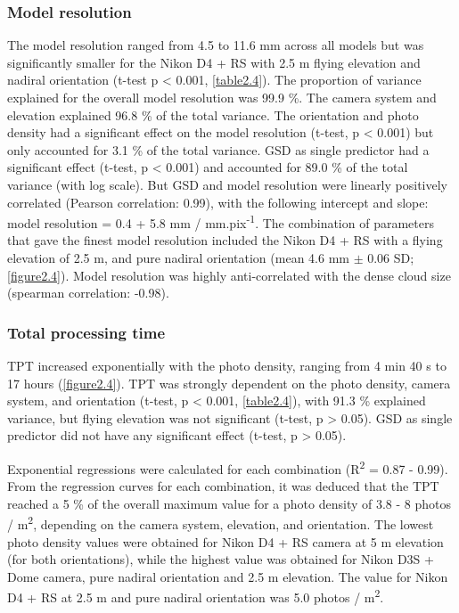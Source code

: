 \subsubsection{Model resolution}\label{chapitre2_3.1.3}
The model resolution ranged from 4.5 to 11.6 mm across all models but was significantly smaller for the Nikon D4 + RS with 2.5 m flying elevation and nadiral orientation (t-test p < 0.001, \autoref{table2.4}). The proportion of variance explained for the overall model resolution was 99.9 \%. The camera system and elevation explained 96.8 \% of the total variance. The orientation and photo density had a significant effect on the model resolution (t-test, p < 0.001) but only accounted for 3.1 \% of the total variance. GSD as single predictor had a significant effect (t-test, p < 0.001) and accounted for 89.0 \% of the total variance (with log scale). But GSD and model resolution were linearly positively correlated (Pearson correlation: 0.99), with the following intercept and slope: model resolution = 0.4 + 5.8 mm / mm.pix\textsuperscript{-1}. The combination of parameters that gave the finest model resolution included the Nikon D4 + RS with a flying elevation of 2.5 m, and pure nadiral orientation (mean 4.6 mm $\pm$ 0.06 SD; \autoref{figure2.4}). Model resolution was highly anti-correlated with the dense cloud size (spearman correlation: -0.98).

\subsubsection{Total processing time}\label{chapitre2_3.1.4}
TPT increased exponentially with the photo density, ranging from 4 min 40 s to 17 hours (\autoref{figure2.4}). TPT was strongly dependent on the photo density, camera system, and orientation (t-test, p < 0.001, \autoref{table2.4}), with 91.3 \% explained variance, but flying elevation was not significant (t-test, p > 0.05). GSD as single predictor did not have any significant effect (t-test, p > 0.05).

Exponential regressions were calculated for each combination (R\textsuperscript{2} = 0.87 - 0.99). From the regression curves for each combination, it was deduced that the TPT reached a 5 \% of the overall maximum value for a photo density of 3.8 - 8 photos / m\textsuperscript{2}, depending on the camera system, elevation, and orientation. The lowest photo density values were obtained for Nikon D4 + RS camera at 5 m elevation (for both orientations), while the highest value was obtained for Nikon D3S + Dome camera, pure nadiral orientation and 2.5 m elevation. The value for Nikon D4 + RS at 2.5 m and pure nadiral orientation was 5.0 photos / m\textsuperscript{2}.

